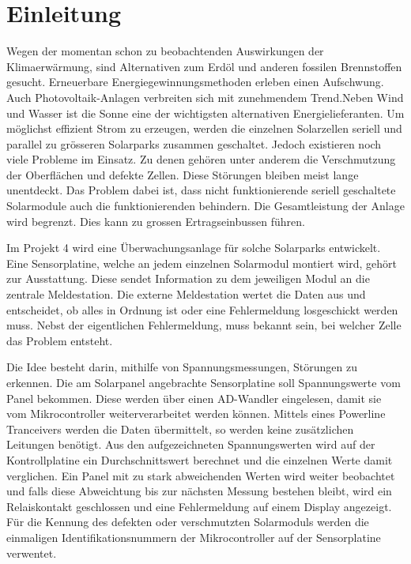 \section{Einleitung}


Wegen der momentan schon zu beobachtenden Auswirkungen der Klimaerwärmung, sind Alternativen zum Erdöl und anderen fossilen Brennstoffen gesucht. Erneuerbare Energiegewinnungsmethoden erleben einen Aufschwung. Auch Photovoltaik-Anlagen verbreiten sich mit zunehmendem Trend.Neben Wind und Wasser ist die Sonne eine der wichtigsten alternativen Energielieferanten. Um möglichst effizient Strom zu erzeugen, werden die einzelnen Solarzellen seriell und parallel zu grösseren Solarparks zusammen geschaltet. Jedoch existieren noch viele Probleme im Einsatz. Zu denen gehören unter anderem die Verschmutzung der Oberflächen und defekte Zellen. Diese Störungen bleiben meist lange unentdeckt. Das Problem dabei ist, dass nicht funktionierende seriell geschaltete Solarmodule auch die funktionierenden behindern. Die Gesamtleistung der Anlage wird begrenzt. Dies kann zu grossen Ertragseinbussen führen.


Im Projekt 4 wird eine Überwachungsanlage für solche Solarparks entwickelt. Eine Sensorplatine, welche an jedem einzelnen Solarmodul montiert wird, gehört zur Ausstattung. Diese sendet Information zu dem jeweiligen Modul an die zentrale Meldestation. Die externe Meldestation wertet die Daten aus und entscheidet, ob alles in Ordnung ist oder eine Fehlermeldung losgeschickt werden muss. Nebst der eigentlichen Fehlermeldung, muss bekannt sein, bei welcher Zelle das Problem entsteht.



Die Idee besteht darin, mithilfe von Spannungsmessungen, Störungen zu erkennen. Die am Solarpanel angebrachte Sensorplatine soll  Spannungswerte vom Panel bekommen. Diese werden über einen AD-Wandler eingelesen, damit sie vom Mikrocontroller weiterverarbeitet werden können. Mittels eines Powerline Tranceivers werden die Daten übermittelt, so werden keine zusätzlichen Leitungen benötigt. Aus den aufgezeichneten Spannungswerten wird auf der Kontrollplatine ein Durchschnittswert berechnet und die einzelnen Werte damit verglichen. Ein Panel mit zu stark abweichenden Werten wird weiter beobachtet und falls diese Abweichtung bis zur nächsten Messung bestehen bleibt, wird ein Relaiskontakt geschlossen und eine Fehlermeldung auf einem Display angezeigt. Für die Kennung des defekten oder verschmutzten Solarmoduls  werden die einmaligen Identifikationsnummern der Mikrocontroller auf der Sensorplatine verwentet.
